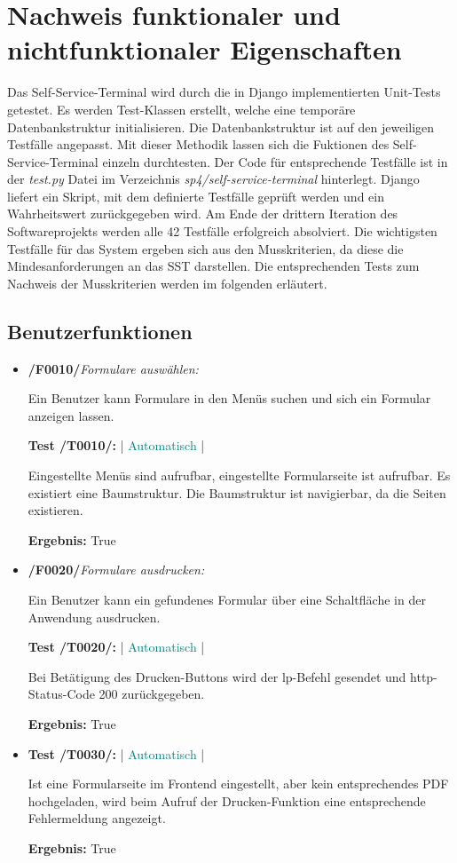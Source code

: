 \section{Nachweis funktionaler und nichtfunktionaler Eigenschaften}

Das Self-Service-Terminal wird durch die in Django implementierten Unit-Tests getestet. Es werden Test-Klassen erstellt, welche eine temporäre Datenbankstruktur initialisieren. Die Datenbankstruktur ist auf den jeweiligen Testfälle angepasst. Mit dieser Methodik lassen sich die Fuktionen des Self-Service-Terminal einzeln durchtesten. Der Code für entsprechende Testfälle ist in der \textit{test.py} Datei im Verzeichnis \textit{sp4/self-service-terminal} hinterlegt. Django liefert ein Skript, mit dem definierte Testfälle geprüft werden und ein Wahrheitswert zurückgegeben wird. Am Ende der drittern Iteration des Softwareprojekts werden alle 42 Testfälle erfolgreich absolviert. Die wichtigsten Testfälle für das System ergeben sich aus den Musskriterien, da diese die Mindesanforderungen an das SST darstellen. Die entsprechenden Tests zum Nachweis der Musskriterien werden im folgenden erläutert.

\vspace{1cm}

\subsection{Benutzerfunktionen}

\begin{itemize}
    \item \textbf{/F0010/}\textit{Formulare auswählen:} \par
    Ein Benutzer kann Formulare in den Menüs suchen und sich ein Formular anzeigen lassen.\par
    \noindent \textbf{Test /T0010/:} | \textcolor{teal}{Automatisch} |\par 
    Eingestellte Menüs sind aufrufbar, eingestellte Formularseite ist aufrufbar. Es existiert eine Baumstruktur. Die Baumstruktur ist navigierbar, da die Seiten existieren.\par
    \noindent \textbf{Ergebnis:} True
    \newpage
    \item \textbf{/F0020/}\textit{Formulare ausdrucken:} \par
    Ein Benutzer kann ein gefundenes Formular über eine Schaltfläche in der Anwendung ausdrucken.\par
    \noindent \textbf{Test /T0020/:} | \textcolor{teal}{Automatisch} |  \par
    Bei Betätigung des Drucken-Buttons wird der lp-Befehl gesendet und http-Status-Code 200 zurückgegeben.\par
    \noindent \textbf{Ergebnis:} True
    \item \noindent \textbf{Test /T0030/:} | \textcolor{teal}{Automatisch} |\par  Ist eine Formularseite im Frontend eingestellt, aber kein entsprechendes PDF hochgeladen, wird beim Aufruf der Drucken-Funktion eine entsprechende Fehlermeldung angezeigt.\par
    \noindent \textbf{Ergebnis:} True
\end{itemize}
\vspace{1cm}
